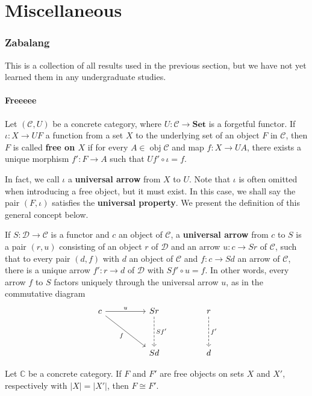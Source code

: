 

\setcounter{section}{-1}

\part{Miscellaneous}

\section{Zabalang}
This is a collection of all results used in the previous section, but we have not yet learned them in any undergraduate studies.

\subsection{Freeeee}
\begin{definition}
	Let $(\mathcal{C}, U)$ be a concrete category, where $U:\mathcal{C}\rightarrow \mathbf{Set}$ is a forgetful functor. If $\iota: X \rightarrow UF$ a function from a set $X$ to the underlying set of an object $F$ in $\mathcal{C}$, then $F$ is called \textbf{free on $X$} if  for every $A \in \operatorname{obj}\mathcal{C}$ and map $f: X \rightarrow UA$, there exists a unique morphism $f':F\rightarrow A$ such that $Uf' \circ \iota = f$.
\end{definition}
\begin{remark}
	In fact, we call $\iota$ a \textbf{universal arrow} from $X$ to $U$. Note that $\iota$ is often omitted when introducing a free object, but it must exist. In this case, we shall say the pair $(F,\iota)$ satisfies the \textbf{universal property}. We present the definition of this general concept below.
\end{remark}
\begin{definition}
	If $S : \mathcal{D} \to \mathcal{C}$ is a functor and $c$ an object of $\mathcal{C}$, a \textbf{universal arrow} from $c$ to $S$ is a pair $( r, u )$ consisting of an object $r$ of $\mathcal{D}$ and an arrow $u : c \to Sr$ of $\mathcal{C}$, such that to every pair $( d, f )$ with $d$ an object of $\mathcal{C}$ and $f \colon c \to Sd$ an arrow of $\mathcal{C}$, there is a unique arrow $f' \colon r \to d$ of $\mathcal{D}$ with $S f' \circ u = f$. In other words, every arrow $f$ to $S$ factors uniquely through the universal arrow $u$, as in the commutative diagram
	\[\begin{tikzcd}
		c && Sr && r \\
		\\
		&& Sd && d
		\arrow["u", from=1-1, to=1-3]
		\arrow["f"', from=1-1, to=3-3]
		\arrow["{Sf'}", dashed, from=1-3, to=3-3]
		\arrow["{f'}", dashed, from=1-5, to=3-5]
	\end{tikzcd}\]
\end{definition}
\begin{proposition} \label{prop-free}
	Let $\mathbb{C}$ be a concrete category. If $F$ and $F'$ are free objects on sets $X$ and $X'$, respectively with $|X| = |X'|$, then $F\cong F'$.
\end{proposition}


